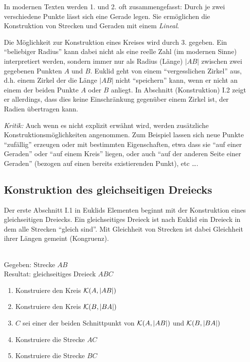 In modernen Texten werden 1. und 2. oft zusammengefasst: Durch je zwei verschiedene Punkte lässt
sich eine Gerade legen.
Sie ermöglichen die Konstruktion von Strecken und Geraden mit einem {\em Lineal}.

Die Möglichkeit zur Konstruktion eines Kreises wird durch 3. gegeben. Ein "`beliebiger Radius"' kann
dabei nicht als eine reelle Zahl (im modernen Sinne) interpretiert werden, sondern immer nur als
Radius (Länge) $|AB|$ zwischen zwei gegebenen Punkten $A$ und $B$. Euklid geht von einem
"`vergesslichen Zirkel"' aus, d.h. einem Zirkel der die Länge $|AB|$ nicht "`speichern"' kann, wenn
er nicht an einem der beiden Punkte $A$ oder $B$ anliegt. In Abschnitt (Konstruktion) I.2 zeigt er
allerdings, dass dies keine Einschränkung gegenüber einem Zirkel ist, der Radien übertragen kann.

{\em Kritik:} Auch wenn es nicht explizit erwähnt wird, werden zusätzliche
Konstruktionsmöglichkeiten angenommen. Zum Beispiel lassen sich neue Punkte "`zufällig"' erzeugen
oder mit bestimmten Eigenschaften, etwa dass sie "`auf einer Geraden"' oder "`auf einem Kreis"'
liegen, oder auch "`auf der anderen Seite einer Geraden"' (bezogen auf einen bereits existierenden
Punkt), etc \dots.

\subsection*{Konstruktion des gleichseitigen Dreiecks}

Der erste Abschnitt I.1 in Euklids Elementen beginnt mit der Konstruktion eines gleichseitigen
Dreiecks. Ein gleichseitiges Dreieck ist nach Euklid ein Dreieck in dem alle Strecken "`gleich
sind"'. Mit Gleichheit von Strecken ist dabei Gleichheit ihrer Längen gemeint (Kongruenz).

\begin{konst}\ \\
    Gegeben: Strecke $AB$\\
    Resultat: gleichseitiges Dreieck $ABC$

    \renewcommand{\labelenumi}{\arabic{enumi}.} %
    \begin{enumerate}
        \item Konstruiere den Kreis ${\mathcal K}(A,|AB|)$
        \item Konstruiere den Kreis ${\mathcal K}(B,|BA|)$
        \item $C$ sei einer der beiden Schnittpunkt von ${\mathcal K}(A,|AB|)$ und ${\mathcal K}(B,|BA|)$
        \item Konstruiere die Strecke $AC$
        \item Konstruiere die Strecke $BC$
    \end{enumerate}
\end{konst}

